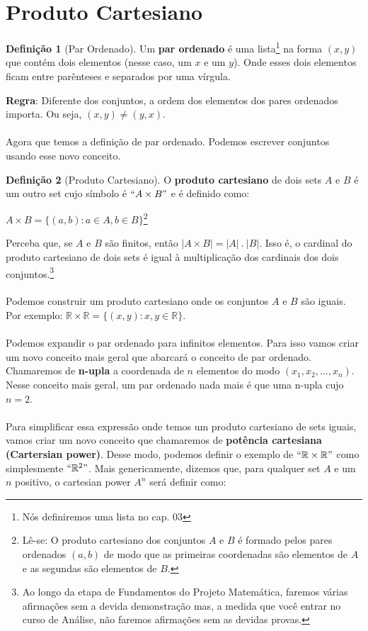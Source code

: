 \documentclass[a4paper,11pt]{book}
\theoremstyle{definition}
\theoremstyle{break}
\newtheorem{definition}{Definição}[section]
\begin{document}
\section{Produto Cartesiano}
\begin{definition}[Par Ordenado]
Um \textbf{par ordenado} é uma lista\footnote{Nós definiremos uma lista no cap. 03} na forma $(x, y)$ que contém dois elementos (nesse caso, um $x$ e um $y$). Onde esses dois elementos ficam entre parênteses e separados por uma vírgula.
\end{definition}

\textbf{Regra}: Diferente dos conjuntos, a ordem dos elementos dos pares ordenados importa. Ou seja, $(x,y) \neq (y,x)$. 
\\
\\
Agora que temos a definição de par ordenado. Podemos escrever conjuntos usando esse novo conceito.

\begin{definition}[Produto Cartesiano]
O \textbf{produto cartesiano} de dois sets $A$ e $B$ é um outro set cujo símbolo é $``A \times B"$ e é definido como:
\begin{center}
$A \times B = \{ (a,b) : a \in A, b \in B \}$\footnote{Lê-se: O produto cartesiano dos conjuntos $A$ e $B$ é formado pelos pares ordenados $(a,b)$ de modo que as primeiras coordenadas são elementos de $A$ e as segundas são elementos de $B$.}
\end{center}
\end{definition}

Perceba que, se $A$ e $B$ são finitos, então $| A \times B | = |A| \ . \ |B|$. Isso é, o cardinal do produto cartesiano de dois sets é igual à multiplicação dos cardinais dos dois conjuntos.\footnote{Ao longo da etapa de Fundamentos do Projeto Matemática, faremos várias afirmações sem a devida demonstração mas, a medida que você entrar no curso de Análise, não faremos afirmações sem as devidas provas.}
\\
\\
Podemos construir um produto cartesiano onde os conjuntos $A$ e $B$ são iguais. Por exemplo: $\mathbb{R} \times \mathbb{R} = \{ (x,y) : x,y \in \mathbb{R} \}$.
\\
\\
Podemos expandir o par ordenado para infinitos elementos. Para isso vamos criar um novo conceito mais geral que abarcará o conceito de par ordenado. Chamaremos de \textbf{n-upla} a coordenada de $n$ elementos do modo $(x_1, x_2, \dots, x_n)$. Nesse conceito mais geral, um par ordenado nada mais é que uma n-upla cujo $n = 2$.
\\
\\
Para simplificar essa expressão onde temos um produto cartesiano de sets iguais, vamos criar um novo conceito que chamaremos de \textbf{potência cartesiana (Cartersian power)}. Desse modo, podemos definir o exemplo de $``\mathbb{R} \times \mathbb{R}"$ como simplesmente $``\mathbb{R}^2"$. Mais genericamente, dizemos que, para qualquer set $A$ e um $n$ positivo, o cartesian power $A^n$ será definir como:
\end{document}
